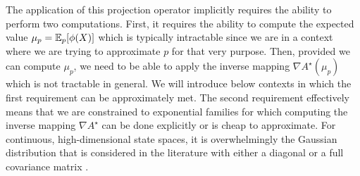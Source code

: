The application of this projection operator implicitly requires the ability to perform two computations. First, it requires the ability to compute the expected value $\mu_p=\mathbb E_{p}[\phi(X)]$ which is typically intractable since we are in a context where we are trying to approximate $p$ for that very purpose. Then, provided we can compute $\mu_p$, we need to be able to apply the inverse mapping $\nabla A^{\star}(\mu_p)$ which is not tractable in general. We will introduce below contexts in which the first requirement can be approximately met. The second requirement effectively means that we are constrained to exponential families for which computing the inverse mapping $\nabla A^{\star}$ can be done explicitly or is cheap to approximate. For continuous, high-dimensional state spaces, it is overwhelmingly the Gaussian distribution that is considered in the literature with either a diagonal or a full covariance matrix \citep{kuss05,herbrich05,herbrich06,yu06,hernandez13}.
%
